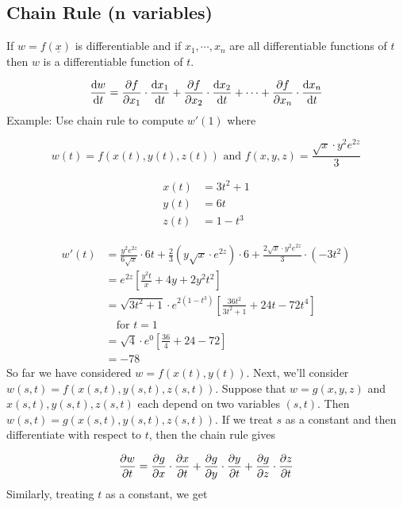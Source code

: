 \documentclass{article}
\newcommand{\n}{\leavevmode \newline} %
\numberwithin{equation}{subsection} %
\begin{document}
\subsection{Chain Rule (n variables)}
If $w=f(\underline{x})$ is differentiable and if $x_1,\cdots,x_n$ are all differentiable functions of $t$ then $w$ is a differentiable function of $t$.

\begin{equation}
    \dv{w}{t}=\pdv{f}{x_1}\cdot\dv{x_1}{t}+\pdv{f}{x_2}\cdot\dv{x_2}{t}+\cdots+\pdv{f}{x_n}\cdot\dv{x_n}{t}
\end{equation}
\n
Example: Use chain rule to compute $w'(1)$ where

\begin{equation}
    w(t)=f(x(t),y(t),z(t)) \text{ and } f(x,y,z)=\frac{\sqrt{x}\cdot y^2 e^{2z}}{3}
\end{equation}

\begin{equation}
    \begin{split}
        x(t)&=3t^2+1\\
        y(t)&=6t\\
        z(t)&=1-t^3
    \end{split}
\end{equation}

\begin{equation}
    \begin{split}
        w'(t)&=\frac{y^2e^{2z}}{6\sqrt{x}}\cdot6t+\frac{2}{3}\left(y\sqrt{x}\cdot e^{2z}\right)\cdot 6 + \frac{2\sqrt{x}\cdot y^2 e^{2z}}{3}\cdot (-3t^2)\\
        &=e^{2z}\left[\frac{y^2t}{x}+4y+2y^2t^2 \right]\\
        &=\sqrt{3t^2+1}\cdot e^{2(1-t^3)}\left[ \frac{36t^2}{3t^2+1}+24t-72t^4\right]\\
        & \quad \text{for } t=1\\
        &=\sqrt{4}\cdot e^0 \left[\frac{36}{4}+24-72\right]\\
        &=-78
    \end{split}
\end{equation}
\n
So far we have considered $w=f(x(t),y(t))$. Next, we'll consider $w(s,t)=f(x(s,t),y(s,t),z(s,t))$. Suppose that $w=g(x,y,z)$ and $x(s,t),y(s,t),z(s,t)$ each depend on two variables $(s,t)$. Then $w(s,t)=g(x(s,t),y(s,t),z(s,t))$. If we treat $s$ as a constant and then differentiate with respect to $t$, then the chain rule gives

\begin{equation}
    \pdv{w}{t}=\pdv{g}{x}\cdot\pdv{x}{t}+\pdv{g}{y}\cdot\pdv{y}{t}+\pdv{g}{z}\cdot\pdv{z}{t}
\end{equation}
\n
Similarly, treating $t$ as a constant, we get
\end{document}
